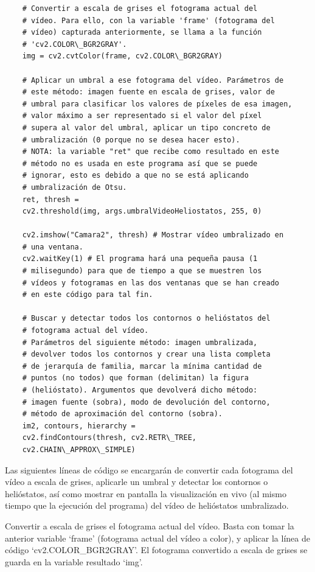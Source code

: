 \begin{lstlisting}
    # Convertir a escala de grises el fotograma actual del
    # vídeo. Para ello, con la variable 'frame' (fotograma del
    # vídeo) capturada anteriormente, se llama a la función
    # 'cv2.COLOR\_BGR2GRAY'.
    img = cv2.cvtColor(frame, cv2.COLOR\_BGR2GRAY)
    
    # Aplicar un umbral a ese fotograma del vídeo. Parámetros de
    # este método: imagen fuente en escala de grises, valor de 
    # umbral para clasificar los valores de píxeles de esa imagen,
    # valor máximo a ser representado si el valor del píxel
    # supera al valor del umbral, aplicar un tipo concreto de
    # umbralización (0 porque no se desea hacer esto).
    # NOTA: la variable "ret" que recibe como resultado en este
    # método no es usada en este programa así que se puede
    # ignorar, esto es debido a que no se está aplicando
    # umbralización de Otsu.
    ret, thresh =
    cv2.threshold(img, args.umbralVideoHeliostatos, 255, 0)
    
    cv2.imshow("Camara2", thresh) # Mostrar vídeo umbralizado en
    # una ventana.
    cv2.waitKey(1) # El programa hará una pequeña pausa (1
    # milisegundo) para que de tiempo a que se muestren los
    # vídeos y fotogramas en las dos ventanas que se han creado
    # en este código para tal fin.

    # Buscar y detectar todos los contornos o helióstatos del
    # fotograma actual del vídeo.
    # Parámetros del siguiente método: imagen umbralizada,
    # devolver todos los contornos y crear una lista completa
    # de jerarquía de familia, marcar la mínima cantidad de
    # puntos (no todos) que forman (delimitan) la figura
    # (helióstato). Argumentos que devolverá dicho método:
    # imagen fuente (sobra), modo de devolución del contorno,
    # método de aproximación del contorno (sobra).
    im2, contours, hierarchy =
    cv2.findContours(thresh, cv2.RETR\_TREE,
    cv2.CHAIN\_APPROX\_SIMPLE)
\end{lstlisting}

Las siguientes líneas de código se encargarán de convertir cada fotograma del vídeo a escala de grises, aplicarle un umbral y detectar los contornos o helióstatos, así como mostrar en pantalla la visualización en vivo (al mismo tiempo que la ejecución del programa) del vídeo de helióstatos umbralizado.

Convertir a escala de grises el fotograma actual del vídeo. Basta con tomar la anterior variable ‘frame’ (fotograma actual del vídeo a color), y aplicar la línea de código ‘cv2.COLOR\_BGR2GRAY’. El fotograma convertido a escala de grises se guarda en la variable resultado ‘img’.

